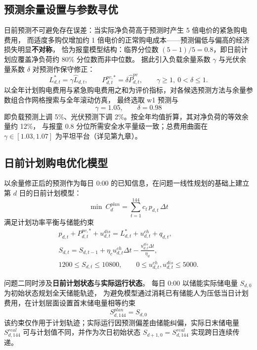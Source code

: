 \subsection{预测余量设置与参数寻优}
日前预测不可避免存在误差：当实际净负荷高于预测时产生 5 倍电价的紧急购电费用，
而适度多购仅增加约 1 倍电价的正常购电成本——预测偏低与偏高的经济损失明显\textbf{不对称}，
恰为报童模型结构\cite{arrow1951}：临界分位数 $(5-1)/5=0.8$，即日前计划应覆盖净负荷约 80\% 分位数而非中位数。
据此引入负载余量系数 $\gamma$ 与光伏余量系数 $\delta$ 对预测作保守修正：
\begin{equation}
L^{*}_{d,t}=\gamma\hat{L}_{d,t},\qquad P^{pv,*}_{d,t}=\delta\hat{P}^{pv}_{d,t},\qquad
\gamma\ge1,\ 0<\delta\le1 .
\end{equation}
以全年计划购电费用与紧急购电费用之和为评价指标，对各候选预测方法与余量参数组合作网格搜索与全年滚动仿真，
最终选取 w1 预测与
\begin{equation}
\gamma=1.05,\qquad \delta=0.98
\end{equation}
即负载预测上调 5\%、光伏预测下调 2\%。按全年均值折算，其对净负荷的等效余量约 12\%，
与报童 0.8 分位所需安全水平量级一致；总费用曲面在 $\gamma\in[1.03,1.07]$ 为平坦平台（详见第九章）。

\subsection{日前计划购电优化模型}
以余量修正后的预测作为每日 0:00 的已知信息，在问题一线性规划的基础上建立第 $d$ 日的日前计划模型：
\begin{equation}
\min\ C^{plan}_{d}=\sum_{t=1}^{144} c_t\,p_{d,t}\,\Delta t
\end{equation}
满足计划功率平衡与储能约束
\begin{gather}
p_{d,t}+P^{pv,*}_{d,t}+u^{dis}_{d,t}=L^{*}_{d,t}+u^{ch}_{d,t}+q_{d,t},\\
S_{d,t}=S_{d,t-1}+\eta_c u^{ch}_{d,t}\Delta t-\frac{u^{dis}_{d,t}\Delta t}{\eta_d},\\
1200\le S_{d,t}\le 10800,\qquad 0\le u^{ch}_{d,t},u^{dis}_{d,t}\le 5000 .
\end{gather}

问题二同时涉及\textbf{日前计划状态}与\textbf{实际运行状态}。
每日 0:00 以储能实际储电量 $S_{d,0}$ 为初始状态规划全天储能轨迹，
为避免模型通过消耗已有储能人为压低当日计划费用，在计划层面设置首末储电量相等约束
\begin{equation}
S^{plan}_{d,144}=S_{d,0}
\end{equation}
该约束仅作用于计划轨迹；实际运行因预测偏差由储能纠偏，实际日末储电量 $S^{real}_{d,144}$
可与计划值不同，并作为次日初始状态 $S_{d+1,0}=S^{real}_{d,144}$ 实现跨日连续传递。

